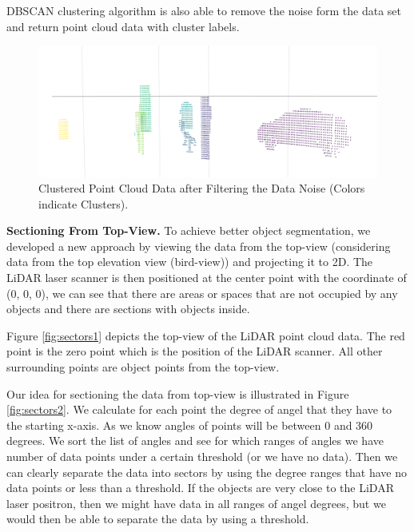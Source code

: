 DBSCAN clustering algorithm is also able to remove the noise form the data set and return point cloud data with cluster labels. 


\begin{figure}[!h]
\begin{center}
  \includegraphics[width=.85\linewidth]{./images/seg_noise_removal.png}
  \caption{Clustered Point Cloud Data after Filtering the Data Noise (Colors indicate Clusters). }
  \label{fig:ClusteringWithNoiseFiltering}
\end{center}
\end{figure}



\textbf{Sectioning From Top-View.}
To achieve better object segmentation, we developed a new approach by viewing the data from the top-view (considering data from the top elevation view (bird-view)) and projecting it to 2D. The LiDAR laser scanner is then positioned at the center point with the coordinate of (0, 0, 0), we can see that there are areas or spaces that are not occupied by any objects and there are sections with objects inside.     

Figure \ref{fig:sectors1} depicts the top-view of the LiDAR point cloud data. 
The red point is the zero point which is the position of the LiDAR scanner. All other surrounding points are object points from the top-view.  

Our idea for sectioning the data from top-view is illustrated in Figure \ref{fig:sectors2}. We calculate for each point the degree of angel that they have to the starting x-axis. As we know angles of points will be between 0 and 360 degrees. We sort the list of angles and see for which ranges of angles we have number of data points under a certain threshold (or we have no data). Then we can clearly separate the data into sectors by using the degree ranges that have no data points or less than a threshold. If the objects are very close to the LiDAR laser positron, then we might have data in all ranges of angel degrees, but we would then be able to separate the data by using a threshold.  


